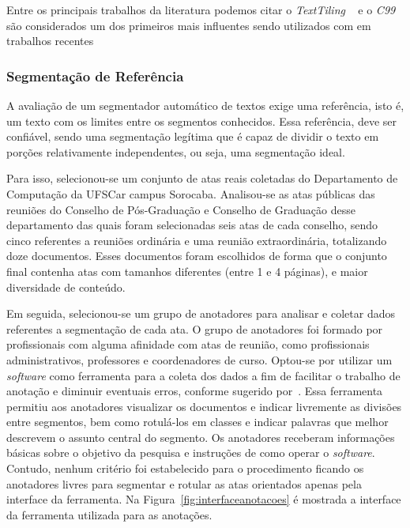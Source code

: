 
Entre os principais trabalhos da literatura podemos citar o \textit{TextTiling} ~\cite{Hearst1994} e o \textit{C99}~\cite{Choi2000} são considerados um dos primeiros mais influentes sendo utilizados com  em trabalhos recentes~\cite{CHAIBI2014, Naili2016, Cardoso2017}



\subsubsection{Segmentação de Referência}
	 \label{subsubsec:segmetacaoreferencia}

A avaliação de um segmentador automático de textos exige uma referência, isto é, um texto com os limites entre os segmentos conhecidos. Essa referência, deve ser confiável, sendo uma segmentação legítima que é capaz de dividir o texto em porções relativamente independentes, ou seja, uma segmentação ideal.

Para isso, selecionou-se um conjunto de atas reais coletadas do Departamento de Computação da UFSCar campus Sorocaba. Analisou-se as atas públicas das reuniões do Conselho de Pós-Graduação e Conselho de Graduação desse departamento das quais foram selecionadas seis atas de cada conselho, sendo cinco referentes a reuniões ordinária e uma reunião extraordinária, totalizando doze documentos. Esses documentos foram escolhidos de forma que o conjunto final contenha atas com tamanhos diferentes (entre 1 e 4 páginas), e maior diversidade de conteúdo.

Em seguida, selecionou-se um grupo de anotadores para analisar e coletar dados referentes a segmentação de cada ata. O grupo de anotadores foi formado por profissionais com alguma afinidade com atas de reunião, como profissionais administrativos, professores e coordenadores de curso. Optou-se por utilizar um \textit{software} como ferramenta para a coleta dos dados a fim de facilitar o trabalho de anotação e diminuir eventuais erros, conforme sugerido por~\cite{Hovy2010}. Essa ferramenta permitiu aos anotadores visualizar os documentos e indicar livremente as divisões entre segmentos, bem como rotulá-los em classes e indicar palavras que melhor descrevem o assunto central do segmento.
Os anotadores receberam informações básicas sobre o objetivo da pesquisa e instruções de como operar o \textit{software}. Contudo, nenhum critério foi estabelecido para o procedimento ficando os anotadores livres para segmentar e rotular as atas orientados apenas pela interface da ferramenta. Na Figura~\ref{fig:interfaceanotacoes} é mostrada a interface da ferramenta utilizada para as anotações.

